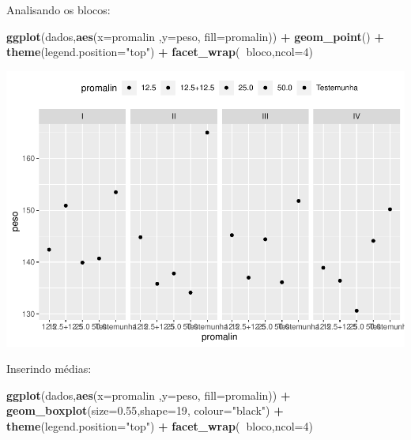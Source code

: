 \documentclass[
]{book}
\newenvironment{Shaded}{\begin{snugshade}}{\end{snugshade}}
\newcommand{\DataTypeTok}[1]{\textcolor[rgb]{0.13,0.29,0.53}{#1}}
\newcommand{\DecValTok}[1]{\textcolor[rgb]{0.00,0.00,0.81}{#1}}
\newcommand{\FloatTok}[1]{\textcolor[rgb]{0.00,0.00,0.81}{#1}}
\newcommand{\KeywordTok}[1]{\textcolor[rgb]{0.13,0.29,0.53}{\textbf{#1}}}
\newcommand{\NormalTok}[1]{#1}
\newcommand{\OperatorTok}[1]{\textcolor[rgb]{0.81,0.36,0.00}{\textbf{#1}}}
\newcommand{\StringTok}[1]{\textcolor[rgb]{0.31,0.60,0.02}{#1}}
\begin{document}
Analisando os blocos:

\begin{Shaded}
\begin{Highlighting}[]
\KeywordTok{ggplot}\NormalTok{(dados,}\KeywordTok{aes}\NormalTok{(}\DataTypeTok{x=}\NormalTok{promalin ,}\DataTypeTok{y=}\NormalTok{peso, }\DataTypeTok{fill=}\NormalTok{promalin)) }\OperatorTok{+}\StringTok{ }
\StringTok{       }\KeywordTok{geom_point}\NormalTok{() }\OperatorTok{+}\StringTok{ }
\StringTok{       }\KeywordTok{theme}\NormalTok{(}\DataTypeTok{legend.position=}\StringTok{"top"}\NormalTok{) }\OperatorTok{+}\StringTok{ }
\StringTok{       }\KeywordTok{facet_wrap}\NormalTok{(}\OperatorTok{~}\NormalTok{bloco,}\DataTypeTok{ncol=}\DecValTok{4}\NormalTok{)}
\end{Highlighting}
\end{Shaded}

\includegraphics{TudodoR_files/figure-latex/unnamed-chunk-233-1.pdf}

Inserindo médias:

\begin{Shaded}
\begin{Highlighting}[]
\KeywordTok{ggplot}\NormalTok{(dados,}\KeywordTok{aes}\NormalTok{(}\DataTypeTok{x=}\NormalTok{promalin ,}\DataTypeTok{y=}\NormalTok{peso, }\DataTypeTok{fill=}\NormalTok{promalin)) }\OperatorTok{+}\StringTok{ }
\StringTok{  }\KeywordTok{geom_boxplot}\NormalTok{(}\DataTypeTok{size=}\FloatTok{0.55}\NormalTok{,}\DataTypeTok{shape=}\DecValTok{19}\NormalTok{, }\DataTypeTok{colour=}\StringTok{"black"}\NormalTok{) }\OperatorTok{+}\StringTok{ }
\StringTok{  }\KeywordTok{theme}\NormalTok{(}\DataTypeTok{legend.position=}\StringTok{"top"}\NormalTok{) }\OperatorTok{+}\StringTok{ }
\StringTok{  }\KeywordTok{facet_wrap}\NormalTok{(}\OperatorTok{~}\NormalTok{bloco,}\DataTypeTok{ncol=}\DecValTok{4}\NormalTok{) }
\end{Highlighting}
\end{Shaded}
\end{document}
